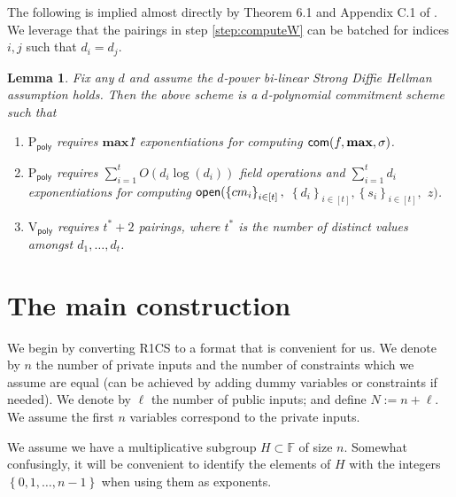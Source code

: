 \documentclass[11pt]{article}
\numberwithin{figure}{section} %
\newtheorem{lemma}[thm]{Lemma}
\renewcommand{\max}{\ensuremath{\mathrm{\mathbf{max}}}\xspace}
\newcommand{\set}[1]{\ensuremath{\left\{#1\right\}}\xspace}
\newcommand{\F}{\ensuremath{\mathbb F}\xspace}
\newcommand{\defeq}{:=}
\newcommand{\sett}[2]{\ensuremath{\set{#1}_{#2}}\xspace}
\newcommand{\prvpoly}{\ensuremath{\mathrm{P_{\mathsf{poly}}}}\xspace}
\newcommand{\verpoly}{\ensuremath{\mathrm{V_{\mathsf{poly}}}}\xspace}
\begin{document}
The following is implied almost directly by Theorem 6.1 and Appendix C.1 of  \cite{sonic}. We leverage that the pairings in step \ref{step:computeW} can be batched for indices $i,j$ such that $d_i=d_j$.
\begin{lemma}\label{lem:pcSCHEME}
Fix any $d$ and assume the $d$-power bi-linear Strong Diffie Hellman assumption holds.
 Then the above scheme is a $d$-polynomial commitment scheme such that
 \begin{enumerate}
  \item \prvpoly requires \max \G1 exponentiations for computing $\com(f,\max,\srs)$.
  \item \prvpoly requires $\sum_{i=1}^t O(d_i\log(d_i))$ field operations and  $\sum_{i=1}^t d_i$ exponentiations for computing $\open(\sett{cm_i}{i\in [t]},$ $\sett{d_i}{i\in [t]},\sett{s_i}{i\in [t]},$ $z)$.
\item \verpoly requires $t^*+2$ pairings, where $t^*$ is the number of distinct values amongst $d_1,\ldots,d_t$.
  \end{enumerate}

\end{lemma}


\section{The main construction}\label{sec:main}
We begin by converting R1CS to a format that is convenient for us.
We denote by $n$ the number of private inputs and the number of constraints which we assume are equal (can be achieved by adding dummy variables or constraints if needed).
We denote by $\ell$ the number of public inputs; and define $N\defeq n+\ell$.
We assume the first $n$ variables correspond to the private inputs.

We assume we have a multiplicative subgroup $H\subset \F$ of size $n$.
Somewhat confusingly, it will be convenient to identify the elements of $H$ with the integers $\set{0,1,\ldots,n-1}$ when using them as exponents.
\end{document}
